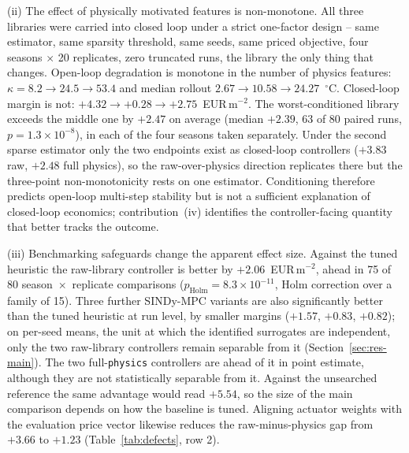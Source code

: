 (ii) The effect of physically motivated features is non-monotone. All three
libraries were carried into closed loop under a
strict one-factor design -- same estimator, same sparsity threshold, same seeds, same
priced objective, four seasons $\times$ 20 replicates, zero truncated runs, the library
the only thing that changes. Open-loop degradation is monotone in the number of physics
features: $\kappa = 8.2 \rightarrow 24.5 \rightarrow 53.4$ and median rollout
$2.67 \rightarrow 10.58 \rightarrow 24.27$~$^\circ$C. Closed-loop margin is not:
$+4.32 \rightarrow +0.28 \rightarrow +2.75$~EUR\,m$^{-2}$. The worst-conditioned library
exceeds the middle one by $+2.47$ on average (median $+2.39$, 63 of 80 paired runs,
$p = 1.3\times10^{-8}$), in each of the four seasons taken separately. Under the second
sparse estimator only the two endpoints exist as closed-loop controllers ($+3.83$ raw,
$+2.48$ full physics), so the raw-over-physics direction replicates there but the
three-point non-monotonicity rests on one estimator. Conditioning therefore predicts
open-loop multi-step stability but is not a sufficient explanation of closed-loop
economics; contribution~(iv) identifies the controller-facing quantity that better tracks
the outcome.

(iii) Benchmarking safeguards change the apparent effect size.
Against the tuned heuristic the raw-library controller is better by
$+2.06$~EUR\,m$^{-2}$, ahead in 75 of 80 season~$\times$~replicate comparisons
($p_{\mathrm{Holm}} = 8.3 \times 10^{-11}$, Holm correction over a family of 15). Three
further SINDy-MPC variants are also significantly better than the tuned heuristic at run
level, by smaller margins ($+1.57$, $+0.83$, $+0.82$); on per-seed means, the unit at
which the identified surrogates are independent, only the two raw-library controllers
remain separable from it (Section~\ref{sec:res-main}). The two full-\texttt{physics}
controllers are ahead of it in point estimate, although they are not statistically
separable from it. Against the unsearched reference the same advantage would read
$+5.54$, so the size of the main comparison depends on how the baseline is tuned.
Aligning actuator weights with the evaluation price vector
likewise reduces the raw-minus-physics gap from $+3.66$ to $+1.23$
(Table~\ref{tab:defects}, row 2).

